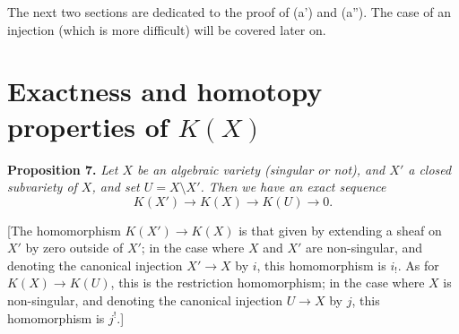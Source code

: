 \documentclass{article}
\newenvironment{itenv}[1]
  {\phantomsection\par\medskip\noindent\textbf{#1.}\itshape}
  {\medskip}
\begin{document}
The next two sections are dedicated to the proof of (a') and (a'').
The case of an injection (which is more difficult) will be covered later on.


\section{Exactness and homotopy properties of \texorpdfstring{$K(X)$}{K(X)}}
\label{section8}

\begin{itenv}{Proposition 7}
\label{proposition7}
  Let $X$ be an algebraic variety (singular or not), and $X'$ a closed subvariety of $X$, and set $U=X\setminus X'$.
  Then we have an exact sequence
  \[
    K(X') \to K(X) \to K(U) \to 0.
  \]
\end{itenv}

[The homomorphism $K(X')\to K(X)$ is that given by extending a sheaf on $X'$ by zero outside of $X'$;
in the case where $X$ and $X'$ are non-singular, and denoting the canonical injection $X'\to X$ by $i$, this homomorphism is $i_!$.
As for $K(X)\to K(U)$, this is the restriction homomorphism;
in the case where $X$ is non-singular, and denoting the canonical injection $U\to X$ by $j$, this homomorphism is $j^!$.]
\end{document}

